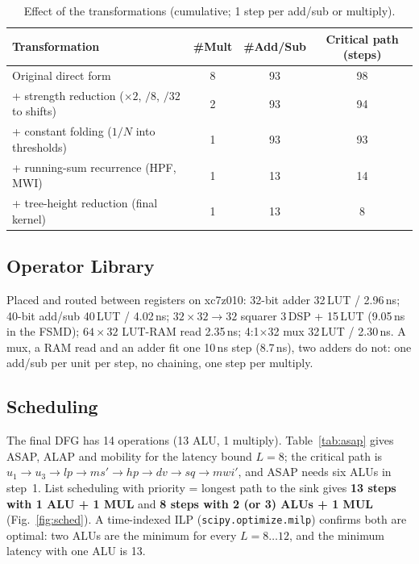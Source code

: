 \documentclass[11pt,a4paper]{article}
\begin{document}
\begin{table}[!tbp]\centering\small
\caption{Effect of the transformations (cumulative; 1 step per add/sub or multiply).}\label{tab:transform}
\begin{tabular}{@{}lccc@{}}
\toprule
Transformation & \#Mult & \#Add/Sub & Critical path (steps)\\
\midrule
Original direct form & 8 & 93 & 98\\
+ strength reduction ($\times2$, $/8$, $/32$ to shifts) & 2 & 93 & 94\\
+ constant folding ($1/N$ into thresholds) & 1 & 93 & 93\\
+ running-sum recurrence (HPF, MWI) & 1 & 13 & 14\\
+ tree-height reduction (final kernel) & 1 & 13 & 8\\
\bottomrule
\end{tabular}
\end{table}

\subsection{Operator Library}
Placed and routed between registers on xc7z010: 32-bit adder 32\,LUT / 2.96\,ns; 40-bit add/sub
40\,LUT / 4.02\,ns; $32\times32\rightarrow32$ squarer 3\,DSP + 15\,LUT (9.05\,ns in the FSMD);
$64\times32$ LUT-RAM read 2.35\,ns; 4:1$\times$32 mux 32\,LUT / 2.30\,ns. A mux, a RAM read and an adder
fit one 10\,ns step (8.7\,ns), two adders do not: one add/sub per unit per step, no chaining, one step
per multiply.

\subsection{Scheduling}
The final DFG has 14 operations (13 ALU, 1 multiply). Table~\ref{tab:asap} gives ASAP, ALAP and
mobility for the latency bound $L=8$; the critical path is $u_1\rightarrow u_3\rightarrow lp
\rightarrow ms'\rightarrow hp\rightarrow dv\rightarrow sq\rightarrow mwi'$, and ASAP needs six ALUs
in step~1. List scheduling with priority = longest path to the sink gives \textbf{13 steps with 1 ALU
+ 1 MUL} and \textbf{8 steps with 2 (or 3) ALUs + 1 MUL} (Fig.~\ref{fig:sched}). A time-indexed ILP
(\texttt{scipy.optimize.milp}) confirms both are optimal: two ALUs are the minimum for every
$L=8\ldots12$, and the minimum latency with one ALU is 13.
\end{document}
